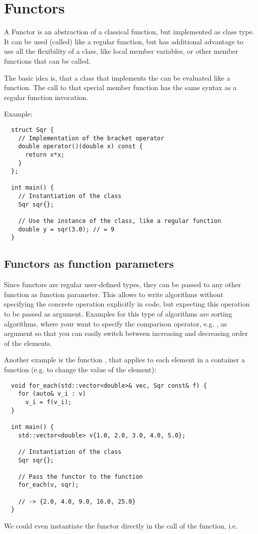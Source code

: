 \chapter{Functors}
A Functor is an abstraction of a classical function, but implemented as class type. It can be used (called) like a regular function, but has additional
advantage to use all the flexibility of a class, like local member variables, or other member functions that can be called.

The basic idea is, that a class that implements the  can be evaluated like a function. The call to that special member function has the same
syntax as a regular function invocation.

Example:
\begin{verbatim}
  struct Sqr {
    // Implementation of the bracket operator
    double operator()(double x) const {
      return x*x;
    }
  };

  int main() {
    // Instantiation of the class
    Sqr sqr{};

    // Use the instance of the class, like a regular function
    double y = sqr(3.0); // = 9
  }
\end{verbatim}


\section{Functors as function parameters}
Since functors are regular user-defined types, they can be passed to any other function as function parameter. This allows to write algorithms
without specifying the concrete operation explicitly in code, but expecting this operation to be passed as argument. Examples for this type
of algorithms are sorting algorithms, where your want to specify the comparison operator, e.g. , as argument so that you
can easily switch between increasing and decreasing order of the elements.

Another example is the function , that applies to each element in a container a function (e.g. to change the value of the element):
\begin{verbatim}
  void for_each(std::vector<double>& vec, Sqr const& f) {
    for (auto& v_i : v)
      v_i = f(v_i);
  }

  int main() {
    std::vector<double> v{1.0, 2.0, 3.0, 4.0, 5.0};

    // Instantiation of the class
    Sqr sqr{};

    // Pass the functor to the function
    for_each(v, sqr);

    // -> {2.0, 4.0, 9.0, 16.0, 25.0}
  }
\end{verbatim}
%
We could even instantiate the functor directly in the call of the  function, i.e.

